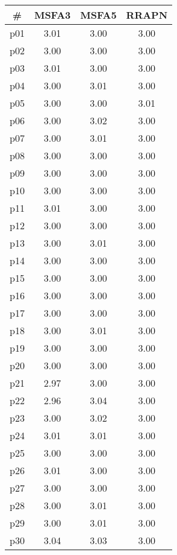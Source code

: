 \begin{tabular}{c||c|c|c}
\textbf{\#} & \textbf{MSFA3} & \textbf{MSFA5} & \textbf{RRAPN}\\
\hline
\hline
p01 & 3.01 & 3.00 & 3.00\\
p02 & 3.00 & 3.00 & 3.00\\
p03 & 3.01 & 3.00 & 3.00\\
p04 & 3.00 & 3.01 & 3.00\\
p05 & 3.00 & 3.00 & 3.01\\
p06 & 3.00 & 3.02 & 3.00\\
p07 & 3.00 & 3.01 & 3.00\\
p08 & 3.00 & 3.00 & 3.00\\
p09 & 3.00 & 3.00 & 3.00\\
p10 & 3.00 & 3.00 & 3.00\\
p11 & 3.01 & 3.00 & 3.00\\
p12 & 3.00 & 3.00 & 3.00\\
p13 & 3.00 & 3.01 & 3.00\\
p14 & 3.00 & 3.00 & 3.00\\
p15 & 3.00 & 3.00 & 3.00\\
p16 & 3.00 & 3.00 & 3.00\\
p17 & 3.00 & 3.00 & 3.00\\
p18 & 3.00 & 3.01 & 3.00\\
p19 & 3.00 & 3.00 & 3.00\\
p20 & 3.00 & 3.00 & 3.00\\
p21 & 2.97 & 3.00 & 3.00\\
p22 & 2.96 & 3.04 & 3.00\\
p23 & 3.00 & 3.02 & 3.00\\
p24 & 3.01 & 3.01 & 3.00\\
p25 & 3.00 & 3.00 & 3.00\\
p26 & 3.01 & 3.00 & 3.00\\
p27 & 3.00 & 3.00 & 3.00\\
p28 & 3.00 & 3.01 & 3.00\\
p29 & 3.00 & 3.01 & 3.00\\
p30 & 3.04 & 3.03 & 3.00\\
\end{tabular}

